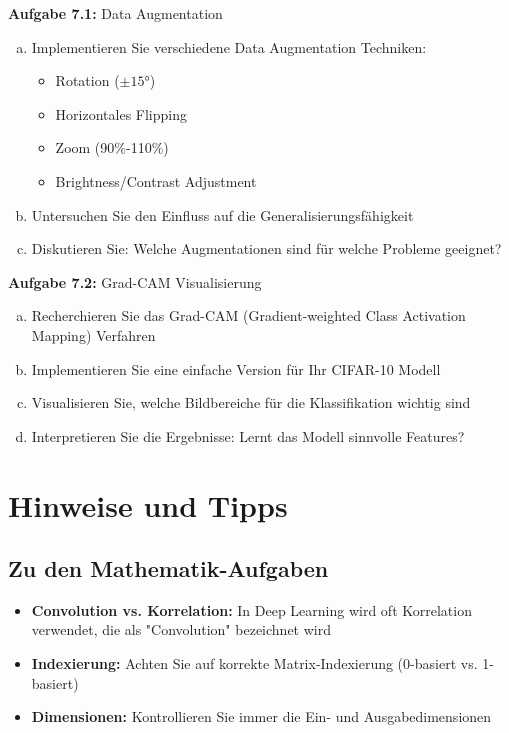 \documentclass[12pt,a4paper]{article}
\begin{document}
\textbf{Aufgabe 7.1:} Data Augmentation

\begin{enumerate}[(a)]
    \item Implementieren Sie verschiedene Data Augmentation Techniken:
    \begin{itemize}
        \item Rotation ($\pm 15°$)
        \item Horizontales Flipping
        \item Zoom (90\%-110\%)
        \item Brightness/Contrast Adjustment
    \end{itemize}
    \item Untersuchen Sie den Einfluss auf die Generalisierungsfähigkeit
    \item Diskutieren Sie: Welche Augmentationen sind für welche Probleme geeignet?
\end{enumerate}

\textbf{Aufgabe 7.2:} Grad-CAM Visualisierung

\begin{enumerate}[(a)]
    \item Recherchieren Sie das Grad-CAM (Gradient-weighted Class Activation Mapping) Verfahren
    \item Implementieren Sie eine einfache Version für Ihr CIFAR-10 Modell
    \item Visualisieren Sie, welche Bildbereiche für die Klassifikation wichtig sind
    \item Interpretieren Sie die Ergebnisse: Lernt das Modell sinnvolle Features?
\end{enumerate}

\section*{Hinweise und Tipps}

\subsection*{Zu den Mathematik-Aufgaben}
\begin{itemize}
    \item \textbf{Convolution vs. Korrelation:} In Deep Learning wird oft Korrelation verwendet, die als "Convolution" bezeichnet wird
    \item \textbf{Indexierung:} Achten Sie auf korrekte Matrix-Indexierung (0-basiert vs. 1-basiert)
    \item \textbf{Dimensionen:} Kontrollieren Sie immer die Ein- und Ausgabedimensionen
\end{itemize}
\end{document}

